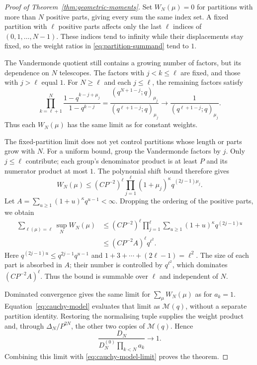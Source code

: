 \documentclass[11pt]{article}
\begin{document}
\begin{proof}[Proof of Theorem~\ref{thm:geometric-moments}]
Set $W_N(\mu)=0$ for partitions with more than $N$ positive parts,
giving every sum the same index set. A fixed partition with $\ell$
positive parts affects only the last $\ell$ indices of
$(0,1,\ldots,N-1)$. These indices tend to infinity while their
displacements stay fixed, so the weight ratios in
\eqref{eq:partition-summand} tend to $1$.

The Vandermonde quotient still contains a growing number of factors,
but its dependence on $N$ telescopes. The factors with $j<k\le\ell$
are fixed, and those with $j>\ell$ equal $1$. For $N\ge\ell$ and
each $j\le\ell$, the remaining factors satisfy
\begin{equation}\label{eq:partition-tail}
 \prod_{k=\ell+1}^{N}
 \frac{1-q^{k-j+\mu_j}}{1-q^{k-j}}
 =\frac{(q^{N+1-j};q)_{\mu_j}}{(q^{\ell+1-j};q)_{\mu_j}}
 \longrightarrow\frac1{(q^{\ell+1-j};q)_{\mu_j}}.
\end{equation}
Thus each $W_N(\mu)$ has the same limit as for constant weights.

The fixed-partition limit does not yet control partitions whose
length or parts grow with $N$. For a uniform bound, group the
Vandermonde factors by $j$. Only $j\le\ell$ contribute; each group's
denominator product is at least $P$ and its numerator product at
most $1$. The polynomial shift bound therefore gives
\[
 W_N(\mu)\le(CP^{-2})^\ell
 \prod_{j=1}^\ell(1+\mu_j)^\kappa q^{(2j-1)\mu_j}.
\]
Let $A=\sum_{u\ge1}(1+u)^\kappa q^{u-1}<\infty$.
Dropping the ordering of the positive parts, we obtain
\begin{align*}
 \sum_{\ell(\mu)=\ell}\sup_N W_N(\mu)
 &\le(CP^{-2})^\ell\prod_{j=1}^\ell
       \sum_{u\ge1}(1+u)^\kappa q^{(2j-1)u}\\
 &\le(CP^{-2}A)^\ell q^{\ell^2}.
\end{align*}
Here $q^{(2j-1)u}\le q^{2j-1}q^{u-1}$ and
$1+3+\cdots+(2\ell-1)=\ell^2$. The size of each part is absorbed
in $A$; their number is controlled by $q^{\ell^2}$, which dominates
$(CP^{-2}A)^\ell$. Thus the bound is summable over $\ell$ and
independent of $N$.

Dominated convergence gives the same limit for
$\sum_\mu W_N(\mu)$ as for $a_k=1$. Equation~\eqref{eq:cauchy-model}
evaluates that limit as $\mathcal M(q)$, without a separate partition
identity. Restoring the normalising tuple supplies the weight
product and, through $\Delta_N/P^{2N}$, the other two copies of
$\mathcal M(q)$. Hence
\[
 \frac{D_N}{D_N^{(0)}\prod_{k<N}a_k}\longrightarrow1.
\]
Combining this limit with \eqref{eq:cauchy-model-limit} proves
the theorem.
\end{proof}
\end{document}
